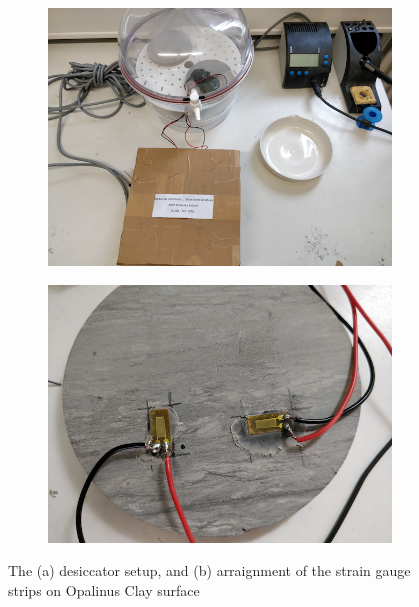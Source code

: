 \begin{figure}[!ht]
\begin{subfigure}[c]{0.48\textwidth}
\includegraphics[width=1\textwidth]{figures/Amir_Shrinkage_Full_Setup.png}
\subcaption{}
\label{fig:Amir_Shrinkage_Full_Setup}
\end{subfigure}
\hfill
\begin{subfigure}[c]{0.48\textwidth}
\includegraphics[width=1\textwidth]{figures/Amir_Shrinkage_Sensors.png}
\subcaption{}
\label{fig:Amir_Shrinkage_Sensors}
\end{subfigure}
\caption{The (a) desiccator setup, and (b) arraignment of the strain gauge strips on Opalinus Clay surface}
\end{figure}

